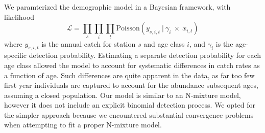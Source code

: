 We paramterized the demographic model in a Bayesian framework, with likelihood
%
\begin{equation} \label{eq:likelihood}
\mathcal{L} = 
\displaystyle\prod_{s}
\displaystyle\prod_{i}
\displaystyle\prod_{t}
\text{Poisson}
    \left(
        y_{s,i,t}~|~\gamma_i~\times~x_{i,t}
    \right)
\end{equation}
%
where $y_{s,i,t}$ is the annual catch for station $s$ and age class $i$,
and $\gamma_i$ is the age-specific detection probability.
Estimating a separate detection probability for each age class allowed the model to account
for systematic differences in catch rates as a function of age.
Such differences are quite apparent in the data, 
as far too few first year individuals are captured to account for the abundance subsequent
ages, assuming a closed population. 
Our model is similar to an N-mixture model, 
however it does not include an explicit binomial detection process.
We opted for the simpler approach because we encountered substantial convergence problems
when attempting to fit a proper N-mixture model.